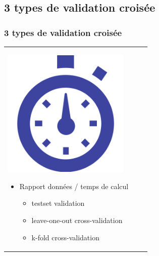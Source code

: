 \documentclass[handout]{beamer}
\begin{document}
	\subsection{3 types de validation croisée}
		\begin{frame}
		\frametitle{3 types de validation croisée}
		\begin{tabular}{l l}
			\begin{minipage}{0.2\textwidth}
				\begin{center}
					\includegraphics[width=0.9\textwidth]{images/clock.png}
				\end{center}
			\end{minipage}

			\begin{minipage}{0.8\textwidth}
				\begin{itemize}
					\item Rapport données / temps de calcul 
					\begin{itemize}
						\item testset validation
						\item leave-one-out cross-validation
						\item k-fold cross-validation
					\end{itemize}
				\end{itemize}
			\end{minipage}

		\end{tabular}
		\end{frame}
\end{document}
